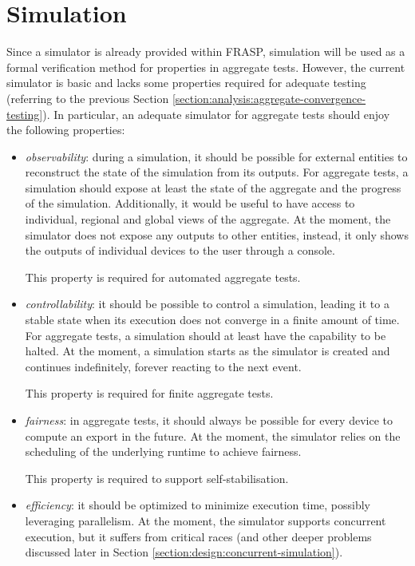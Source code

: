 
\section{Simulation}
\label{section:analysis:simulation}

Since a simulator is already provided within FRASP, simulation will be used as
a formal verification method for properties in aggregate tests. However, the
current simulator is basic and lacks some properties required for adequate
testing (referring to the previous Section
\ref{section:analysis:aggregate-convergence-testing}). In particular, an
adequate simulator for aggregate tests should enjoy the following properties:
\begin{itemize}
  \item \textit{observability}: during a simulation, it should be possible for
        external entities to reconstruct the state of the simulation from its
        outputs. For aggregate tests, a simulation should expose at least the
        state of the aggregate and the progress of the simulation. Additionally,
        it would be useful to have access to individual, regional and global
        views of the aggregate. At the moment, the simulator does not expose
        any outputs to other entities, instead, it only shows the outputs of
        individual devices to the user through a console.

        This property is required for automated aggregate tests.
  \item \textit{controllability}: it should be possible to control a
        simulation, leading it to a stable state when its execution does not
        converge in a finite amount of time. For aggregate tests, a simulation
        should at least have the capability to be halted. At the moment, a
        simulation starts as the simulator is created and continues
        indefinitely, forever reacting to the next event.

        This property is required for finite aggregate tests.
  \item \textit{fairness}: in aggregate tests, it should always be possible for
        every device to compute an export in the future. At the moment, the
        simulator relies on the scheduling of the underlying runtime to achieve
        fairness.

        This property is required to support self-stabilisation.
  \item \textit{efficiency}: it should be optimized to minimize execution time,
        possibly leveraging parallelism. At the moment, the simulator supports
        concurrent execution, but it suffers from critical races (and other
        deeper problems discussed later in Section
        \ref{section:design:concurrent-simulation}).


\end{itemize}

